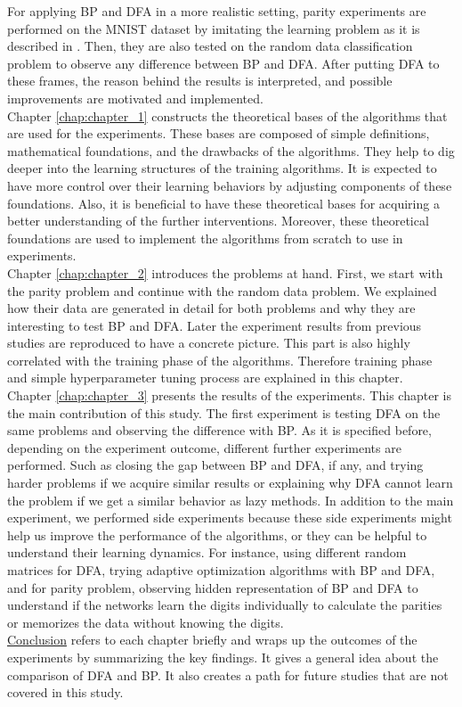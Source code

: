 \documentclass[a4paper, nobind]{templates/ociamthesis}
\begin{document}
For applying BP and DFA in a more realistic setting, parity experiments are performed on the MNIST dataset by imitating the learning problem as it is described in \cite{DBLP:journals/corr/abs-2002-07400}. Then, they are also tested on the random data classification problem to observe any difference between BP and DFA. After putting DFA to these frames, the reason behind the results is interpreted, and possible improvements are motivated and implemented.\\
Chapter \ref{chap:chapter_1} constructs the theoretical bases of the algorithms that are used for the experiments. These bases are composed of simple definitions, mathematical foundations, and the drawbacks of the algorithms. They help to dig deeper into the learning structures of the training algorithms. It is expected to have more control over their learning behaviors by adjusting components of these foundations. Also, it is beneficial to have these theoretical bases for acquiring a better understanding of the further interventions. Moreover, these theoretical foundations are used to implement the algorithms from scratch to use in experiments.\\
Chapter \ref{chap:chapter_2} introduces the problems at hand. First, we start with the parity problem and continue with the random data problem. We explained how their data are generated in detail for both problems and why they are interesting to test BP and DFA. Later the experiment results from previous studies \cite{DBLP:journals/corr/abs-2002-07400, chizat2020implicit} are reproduced to have a concrete picture. This part is also highly correlated with the training phase of the algorithms. Therefore training phase and simple hyperparameter tuning process are explained in this chapter.\\
Chapter \ref{chap:chapter_3} presents the results of the experiments. This chapter is the main contribution of this study. The first experiment is testing DFA on the same problems and observing the difference with BP. As it is specified before, depending on the experiment outcome, different further experiments are performed. Such as closing the gap between BP and DFA, if any, and trying harder problems if we acquire similar results or explaining why DFA cannot learn the problem if we get a similar behavior as lazy methods. In addition to the main experiment, we performed side experiments because these side experiments might help us improve the performance of the algorithms, or they can be helpful to understand their learning dynamics. For instance, using different random matrices for DFA, trying adaptive optimization algorithms with BP and DFA, and for parity problem, observing hidden representation of BP and DFA to understand if the networks learn the digits individually to calculate the parities or memorizes the data without knowing the digits.\\
\protect\hyperlink{chap:conc}{Conclusion} refers to each chapter briefly and wraps up the outcomes of the experiments by summarizing the key findings. It gives a general idea about the comparison of DFA and BP. It also creates a path for future studies that are not covered in this study.
\end{document}

